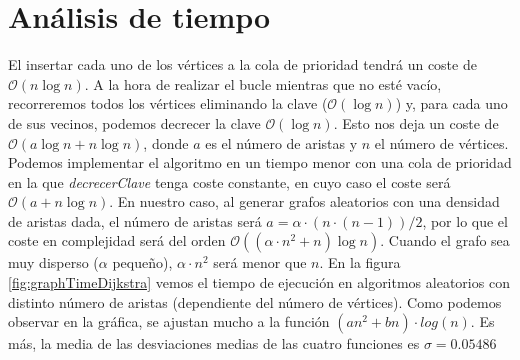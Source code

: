 \documentclass{article}
\begin{document}
\section{Análisis de tiempo}
El insertar cada uno de los vértices a la cola de prioridad tendrá un coste de $\mathcal{O}(n\log n)$. A la hora de realizar el bucle mientras que no esté vacío, recorreremos todos los vértices eliminando la clave ($\mathcal{O} (\log n)$) y, para cada uno de sus vecinos, podemos decrecer la clave $\mathcal{O}(\log n)$. Esto nos deja un coste de $\mathcal{O}\left(a\log n+n\log n\right)$, donde $a$ es el número de aristas y $n$ el número de vértices. Podemos implementar el algoritmo en un tiempo menor con una cola de prioridad en la que \textit{decrecerClave} tenga coste constante, en cuyo caso el coste será $\mathcal{O}(a + n\log n)$. En nuestro caso, al generar grafos aleatorios con una densidad de aristas dada, el número de aristas será $a = \alpha\cdot(n\cdot(n-1))/2$, por lo que el coste en complejidad será del orden $\mathcal{O}((\alpha\cdot n^2+n)\log n)$. Cuando el grafo sea muy disperso ($\alpha$ pequeño), $\alpha\cdot n^2$ será menor que $n$. En la figura \ref{fig:graphTimeDijkstra} vemos el tiempo de ejecución en algoritmos aleatorios con distinto número de aristas (dependiente del número de vértices). Como podemos observar en la gráfica, se ajustan mucho a la función $(an^2+bn)\cdot log(n)$. Es más, la media de las desviaciones medias de las cuatro funciones es $\sigma=0.05486$
\end{document}
